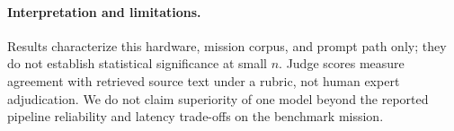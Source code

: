 \paragraph{Interpretation and limitations.}
Results characterize this hardware, mission corpus, and prompt path only; they do not establish statistical significance at small $n$. Judge scores measure agreement with retrieved source text under a rubric, not human expert adjudication. We do not claim superiority of one model beyond the reported pipeline reliability and latency trade-offs on the benchmark mission.

\newcommand{\BenchTrialN}{10}
\newcommand{\BenchLlamaGen}{\textit{[pending]}}
\newcommand{\BenchGemmaGen}{\textit{[pending]}}
\newcommand{\BenchPhiGen}{\textit{[pending]}}
\newcommand{\BenchLlamaSucc}{\textit{[pending]}}
\newcommand{\BenchGemmaSucc}{\textit{[pending]}}
\newcommand{\BenchPhiSucc}{\textit{[pending]}}
\newcommand{\BenchLlamaGround}{\textit{[pending]}}
\newcommand{\BenchGemmaGround}{\textit{[pending]}}
\newcommand{\BenchPhiGround}{\textit{[pending]}}
\newcommand{\BenchLlamaHall}{\textit{[pending]}}
\newcommand{\BenchGemmaHall}{\textit{[pending]}}
\newcommand{\BenchPhiHall}{\textit{[pending]}}
